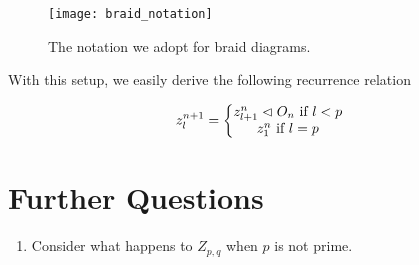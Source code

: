\documentclass[paper.tex]{subfiles}
\begin{document}
\begin{figure}[h]
   \centering
   \texttt{[image: braid\_notation]}
   \caption{The notation we adopt for braid diagrams.}\label{fig:braid_notation}
\end{figure}

With this setup, we easily derive the following recurrence relation

\begin{equation}
   \label{eq:pq_recurrence}
   z^{n+1}_l = \left\{
   \begin{matrix}
        z^n_{l+1} \vartriangleleft O_n \text{ if } l < p \\
        z^n_1 \text{ if } l = p
   \end{matrix}
   \right.
\end{equation}


\section{Further Questions}\label{fqs}

\begin{enumerate}
	\item Consider what happens to $Z_{p,q}$ when $p$ is not prime.
\end{enumerate}



\end{document}
